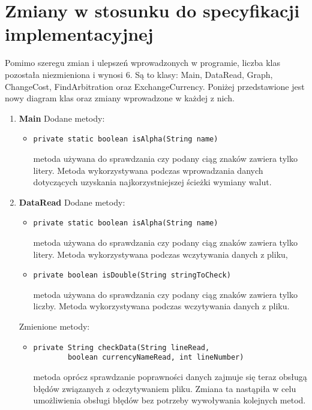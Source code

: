 \documentclass[12pt]{article}
\begin{document}
\section{Zmiany w stosunku do specyfikacji implementacyjnej}
Pomimo szeregu zmian i ulepszeń wprowadzonych w programie, liczba klas pozostała niezmieniona i wynosi 6. Są to klasy: Main, DataRead, Graph, ChangeCost, FindArbitration oraz ExchangeCurrency. Poniżej przedstawione jest nowy diagram klas oraz zmiany wprowadzone w każdej z nich.
\begin{enumerate}
\item \textbf{Main}
\newline\newline
   Dodane metody:
    \begin{itemize}
        \item \begin{verbatim}private static boolean isAlpha(String name)\end{verbatim}
        metoda używana do sprawdzania czy podany ciąg znaków zawiera tylko litery. Metoda wykorzystywana podczas wprowadzania danych dotyczących uzyskania najkorzystniejszej ścieżki wymiany walut.
    \end{itemize}
\item \textbf{DataRead}
\newline\newline
   Dodane metody:
    \begin{itemize}
        \item \begin{verbatim}private static boolean isAlpha(String name)\end{verbatim}
        metoda używana do sprawdzania czy podany ciąg znaków zawiera tylko litery. Metoda wykorzystywana podczas wczytywania danych z pliku,
    \item \begin{verbatim}private boolean isDouble(String stringToCheck)\end{verbatim}
        metoda używana do sprawdzania czy podany ciąg znaków zawiera tylko liczby. Metoda wykorzystywana
        podczas wczytywania danych z pliku.
    \end{itemize}
    Zmienione metody:
    \begin{itemize}
        \item \begin{verbatim}private String checkData(String lineRead,
        boolean currencyNameRead, int lineNumber)\end{verbatim}
        metoda oprócz sprawdzanie poprawności danych zajmuje się teraz obsługą błędów związanych z odczytywaniem pliku. Zmiana ta nastąpiła w celu umożliwienia obsługi błędów bez potrzeby wywoływania kolejnych metod.

\end{itemize}
\end{enumerate}
\end{document}
